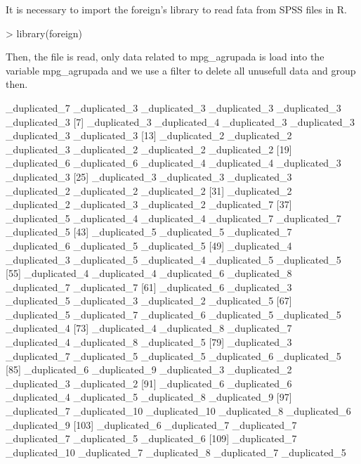 \documentclass[a4paper]{article}
\begin{document}
	It is necessary to import the foreign's library to read fata from SPSS files in R.
\begin{Schunk}
\begin{Sinput}
> library(foreign)
\end{Sinput}
\end{Schunk}
	Then, the file is read, only data related to mpg_agrupada is load into the variable mpg_agrupada
	and we use a filter to delete all unusefull data and group then.
\begin{Schunk}
\begin{Soutput}
  [1] _duplicated_7  _duplicated_3  _duplicated_3  _duplicated_3  _duplicated_3  _duplicated_3 
  [7] _duplicated_3  _duplicated_4  _duplicated_3  _duplicated_3  _duplicated_3  _duplicated_3 
 [13] _duplicated_2  _duplicated_2  _duplicated_3  _duplicated_2  _duplicated_2  _duplicated_2 
 [19] _duplicated_6  _duplicated_6  _duplicated_4  _duplicated_4  _duplicated_3  _duplicated_3 
 [25] _duplicated_3  _duplicated_3  _duplicated_3  _duplicated_2  _duplicated_2  _duplicated_2 
 [31] _duplicated_2  _duplicated_2                 _duplicated_3  _duplicated_2  _duplicated_7 
 [37] _duplicated_5  _duplicated_4  _duplicated_4  _duplicated_7  _duplicated_7  _duplicated_5 
 [43] _duplicated_5  _duplicated_5  _duplicated_7  _duplicated_6  _duplicated_5  _duplicated_5 
 [49] _duplicated_4  _duplicated_3  _duplicated_5  _duplicated_4  _duplicated_5  _duplicated_5 
 [55] _duplicated_4  _duplicated_4  _duplicated_6  _duplicated_8  _duplicated_7  _duplicated_7 
 [61] _duplicated_6  _duplicated_3  _duplicated_5  _duplicated_3  _duplicated_2  _duplicated_5 
 [67] _duplicated_5  _duplicated_7  _duplicated_6  _duplicated_5  _duplicated_5  _duplicated_4 
 [73] _duplicated_4  _duplicated_8  _duplicated_7  _duplicated_4  _duplicated_8  _duplicated_5 
 [79] _duplicated_3  _duplicated_7  _duplicated_5  _duplicated_5  _duplicated_6  _duplicated_5 
 [85] _duplicated_6  _duplicated_9  _duplicated_3  _duplicated_2  _duplicated_3  _duplicated_2 
 [91] _duplicated_6  _duplicated_6  _duplicated_4  _duplicated_5  _duplicated_8  _duplicated_9 
 [97] _duplicated_7  _duplicated_10 _duplicated_10 _duplicated_8  _duplicated_6  _duplicated_9 
[103] _duplicated_6  _duplicated_7  _duplicated_7  _duplicated_7  _duplicated_5  _duplicated_6 
[109] _duplicated_7  _duplicated_10 _duplicated_7  _duplicated_8  _duplicated_7  _duplicated_5 

\end{Soutput}
\end{Schunk}
\end{document}
